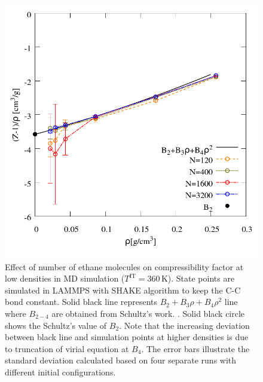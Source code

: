 \documentclass[5p,times]{elsarticle}
\begin{document}
\begin{figure}
\includegraphics[scale=0.3]{Figures/FSE_TraPPE-C2_Lammps-rigid_IT.png}
\caption{Effect of number of ethane molecules on compressibility factor at low densities in MD simulation ($T^{\mathrm{IT}}=360 \, \mathrm{K}$). State points are simulated in LAMMPS with SHAKE algorithm to keep the C-C bond constant. Solid black line represents $B_2+B_3 \rho+B_4 \rho^2$ line where $B_{2-4}$ are obtained from Schultz's work. \cite{Schultz2010a}. Solid black circle shows the Schultz's value of $B_2$. Note that the increasing  deviation between black line and simulation points at higher densities is due to truncation of virial equation at $B_4$. The error bars illustrate the standard deviation calculated based on four separate runs with different initial configurations.
}
\label{fig:FSE_TraPPE_C2_Lammps_rigid_IT}
\end{figure}
\end{document}
